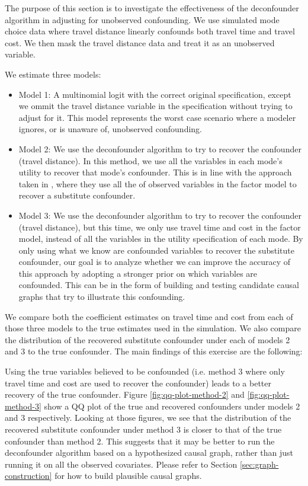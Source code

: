 The purpose of this section is to investigate the effectiveness of the
deconfounder algorithm \citep{wang_2019_blessings} in adjusting for unobserved
confounding. We use simulated mode choice data where travel distance
linearly confounds both travel time and travel cost. We then mask the travel
distance data and treat it as an unobserved variable.


We estimate three models:

\begin{itemize}
	\item Model 1: A multinomial logit with the correct original specification,
	except we ommit the travel distance variable in the specification without
	trying to adjust for it. This model represents the worst case scenario
	where a modeler ignores, or is unaware of, unobserved confounding.
	\item Model 2: We use the deconfounder algorithm to try to recover the
	confounder (travel distance). In this method, we use all the variables in
	each mode's utility to recover that mode's confounder. This is in line
	with the approach taken in \citet{wang_2019_blessings}, where they use all the
	of observed variables in the factor model to recover a substitute
	confounder.
	\item Model 3: We use the deconfounder algorithm to try to recover the
	confounder (travel distance), but this time, we only use travel time and
	cost in the factor model, instead of all the variables in the utility
	specification of each mode. By only using what we know are confounded
	variables to recover the substitute confounder, our goal is to analyze
	whether we can improve the accuracy of this approach by adopting a stronger
	prior on which variables are confounded. This can
	be in the form of building and testing candidate causal graphs that
	try to illustrate this confounding.
\end{itemize}


We compare both the coefficient estimates on travel time and cost from
each of those three models to the true estimates used in the simulation.
We also compare the distribution of the recovered substitute confounder under each of
models 2 and 3 to the true confounder. The main findings of this exercise are the following:


Using the true variables believed to be confounded (i.e. method 3 where only
travel time and cost are used to recover the confounder) leads to a better
recovery of the true confounder. Figure \ref{fig:qq-plot-method-2} and \ref{fig:qq-plot-method-3} show a QQ plot of the true
and recovered confounders under models 2 and 3 respectively. Looking at those
figures, we see that the distribution of the recovered substitute
confounder under method 3 is closer to that of the true confounder than method
2. This suggests that it may be better to run the deconfounder algorithm based
on a hypothesized causal graph, rather than just running it on all the
observed covariates. Please refer to Section \ref{sec:graph-construction} for how to build plausible causal graphs.


